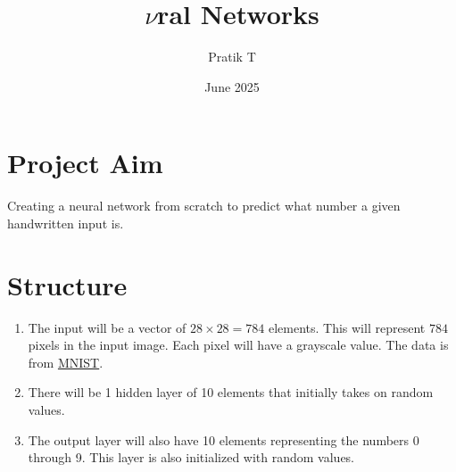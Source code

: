 \documentclass{article}
\title{$\nu$ral Networks}
\author{Pratik T}
\date{June 2025}
\begin{document}
\maketitle

\section{Project Aim}

Creating a neural network from scratch to predict what number a given handwritten input is.

\section{Structure}

\begin{enumerate}
    \item The input will be a vector of $28\times28 = 784$ elements. This will represent $784$ pixels in the input image. Each pixel will have a grayscale value. The data is from \href{https://www.kaggle.com/datasets/animatronbot/mnist-digit-recognizer}{MNIST}.
    \item There will be 1 hidden layer of 10 elements that initially takes on random values. 
    \item The output layer will also have 10 elements representing the numbers 0 through 9. This layer is also initialized with random values.
\end{enumerate}
\end{document}
